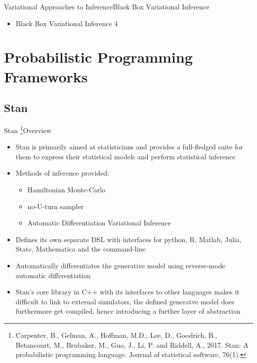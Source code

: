 \documentclass[AERbeamer%
              ,optEnglish%
              ,optBiber%
              ,optBibstyleAlphabetic%
              ,optBeamerClassicFormat%
              ]{AERlatex}%
\begin{document}
\begin{frame}[c]{Variational Approaches to Inference}{Black Box Variational Inference}
    \centering
    \begin{itemize}
        \item Black Box Variational Inference 4
    \end{itemize}
\end{frame}




\section{Probabilistic Programming Frameworks}


\subsection{Stan}
\begin{frame}[c]{Stan \footnote{Carpenter, B., Gelman, A., Hoffman, M.D., Lee, D.,
                                Goodrich, B., Betancourt, M., Brubaker, M., Guo, J., Li, P.
                                and Riddell, A., 2017. Stan: A probabilistic programming
                                language. Journal of statistical software, 76(1).}}{Overview}
    \centering
    \begin{itemize}
        \item Stan is primarily aimed at statisticians and provides a full-fledged suite for them
              to express their statistical models and perform statistical inference
        \item Methods of inference provided:
        \begin{itemize}
            \item Hamiltonian Monte-Carlo
            \item no-U-turn sampler
            \item Automatic Differentiation Variational Inference
        \end{itemize}
        \item Defines its own separate DSL with interfaces for python, R, Matlab, Julia, State, Mathematica and the command-line
        \item Automatically differentiates the generative model using reverse-mode automatic differentiation
        \item Stan's core library in C++ with its interfaces to other languages makes it difficult to link to
              external simulators, the defined generatve model does furthermore get compiled, hence introducing
              a further layer of abstraction
    \end{itemize}
\end{frame}
\end{document}
